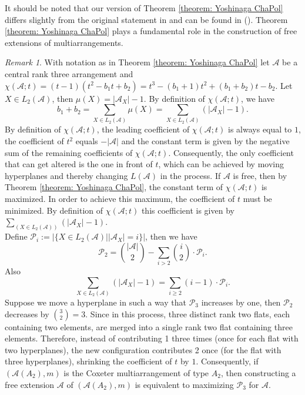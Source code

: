 \documentclass[12pt]{amsart}
\theoremstyle{definition}
\theoremstyle{remark}
\newtheorem{remark}[theorem]{Remark}
\newcommand\CA{{\mathscr A}}
\begin{document}
It should be noted that our version of Theorem \ref{theorem: Yoshinaga ChaPol} differs slightly from the original statement in \cite{MR2105827} and can be found in (\cite[Thm.~1.39]{MR3205600}). Theorem \ref{theorem: Yoshinaga ChaPol} plays a fundamental role in the construction of free extensions of multiarrangements. 

\begin{remark}\label{Remark: Altering the coefficients of chi(A,t)}  
With notation as in Theorem \ref{theorem: Yoshinaga ChaPol} let $\CA$ be a central rank three arrangement and $\chi(\CA;t)=(t-1)(t^2-b_1t+b_2)=t^3-(b_1+1) t^2 + (b_1+b_2) t  - b_2$. Let $X\in L_2(\CA)$, then $\mu(X)=\vert\CA_X\vert-1$. By definition of $\chi(\CA;t)$, we have  $$b_1+b_2=\sum_{X\in L_2(\CA)}\mu(X)=\sum_{X\in L_2(\CA)}(\vert\CA_X\vert-1).$$ 
By definition of $\chi(\CA;t)$, the leading coefficient of $\chi(\CA;t)$ is always equal to $1$, the coefficient of $t^2$ equals $-\vert\CA\vert$ and the constant term is given by the negative sum of the remaining coefficients of $\chi(\CA;t)$. Consequently, the only coefficient that can get altered is the one in front of $t$, which can be achieved by moving hyperplanes and thereby changing $L(\CA)$ in the process. If $\CA$ is free, then by Theorem \ref{theorem: Yoshinaga ChaPol}, the constant term of $\chi(\CA;t)$ is maximized. In order to achieve this maximum, the coefficient of $t$ must be minimized. By definition of $\chi(\CA;t)$ this coefficient is given by $\sum_{(X\in L_2(\CA))}(\vert\CA_X\vert-1)$.\\

\noindent Define $\mathcal{P}_i:=\vert\{X\in L_2(\CA)\mid\vert\CA_X\vert=i\}\vert$, then we have $$\mathcal{P}_2=\binom{\vert\CA\vert}{2}-\sum_{i>2}\binom{i}{2}\cdot\mathcal{P}_i.$$
Also $$\sum_{X\in L_2(\CA)}(\vert\CA_X\vert-1)=\sum_{i\geq 2} (i-1)\cdot \mathcal{P}_i.$$
Suppose we move a hyperplane in such a way that $\mathcal{P}_3$ increases by one, then $\mathcal{P}_2$ decreases by $\binom{3}{2}=3$. Since in this process, three distinct rank two flats, each containing two elements, are merged into a single rank two flat containing three elements. Therefore, instead of contributing 1 three times (once for each flat with two hyperplanes), the new configuration contributes 2 once (for the flat with three hyperplanes), shrinking the coefficient of $t$ by $1$. Consequently, if $(\CA(A_2),m)$ is the Coxeter multiarrangement of type $A_2$, then constructing a free extension $\CA$ of $(\CA(A_2),m)$ is equivalent to maximizing $\mathcal{P}_3$ for $\CA$.
\end{remark}
\end{document}
